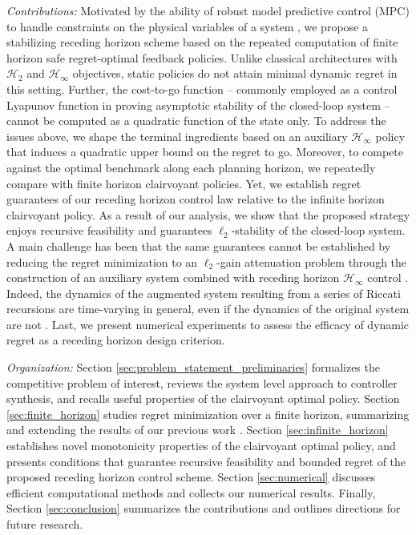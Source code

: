 \documentclass[conference]{IEEEtran}
\begin{document}
\emph{Contributions:}
Motivated by the ability of robust model predictive control (MPC) to handle constraints on the physical variables of a system \cite{rawlings2017model}, we propose a stabilizing receding horizon scheme based on the repeated computation of finite horizon safe regret-optimal feedback policies. Unlike classical architectures with $\mathcal{H}_2$ and $\mathcal{H}_\infty$ objectives, static policies do not attain minimal dynamic regret \cite{sabag2021regret} in this setting. Further, the cost-to-go function – commonly employed as a control Lyapunov function in proving asymptotic stability of the closed-loop system \cite{mayne2000constrained} – cannot be computed as a quadratic function of the state only.
To address the issues above, we shape the terminal ingredients based on an auxiliary $\mathcal{H}_\infty$ policy that induces a quadratic upper bound on the regret to go. Moreover, to compete against the optimal benchmark along each planning horizon, we repeatedly compare with finite horizon clairvoyant policies. Yet, we establish regret guarantees of our receding horizon control law relative to the infinite horizon clairvoyant policy. %
As a result of our analysis, we show that the proposed strategy enjoys recursive feasibility and guarantees $\ell_2$-stability of the closed-loop system. %
A main challenge has been that the same guarantees cannot be established by reducing the regret minimization to an $\ell_2$-gain attenuation problem through the construction of an auxiliary system \cite{goel2023regret} combined with receding horizon $\mathcal{H}_\infty$ control \cite{kim2004disturbance, goulart2009control}. Indeed, the dynamics of the augmented system resulting from a series of Riccati recursions are time-varying in general, even if the dynamics of the original system are not \cite{goel2023regret}. Last, we present numerical experiments to assess the efficacy of dynamic regret as a receding horizon design criterion.

\emph{Organization:} Section \ref{sec:problem_statement_preliminaries} formalizes the competitive problem of interest, reviews the system level approach to controller synthesis, and recalls useful properties of the clairvoyant optimal policy. Section \ref{sec:finite_horizon} studies regret minimization over a finite horizon, summarizing and extending the results of our previous work \cite{martin2022safe}. Section \ref{sec:infinite_horizon} establishes novel monotonicity properties of the clairvoyant optimal policy, and presents conditions that guarantee recursive feasibility and bounded regret of the proposed receding horizon control scheme. Section \ref{sec:numerical} discusses efficient computational methods and collects our numerical results. Finally, Section \ref{sec:conclusion} summarizes the contributions and outlines directions for future research.
\end{document}
